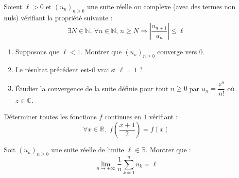 \documentclass[a4paper,twoside,french,11pt]{VcCours}
\begin{document}
\begin{Exercice} Soient $\ell>0$ et $(u_n)_{n \geq 0}$ une suite réelle ou complexe (avec des termes non nuls) vérifiant la propriété suivante :
$$\exists N \in \mathbb{N}, \, \forall n \in \mathbb{N}, \, n \geq N \Longrightarrow \left\vert \frac{u_{n+1}}{u_n} \right\vert   \leq \ell$$

\begin{enumerate}
\item Supposons que $\ell<1$. Montrer que $(u_n)_{n \geq 0}$ converge vers $0$.
\item Le résultat précédent est-il vrai si $\ell = 1$ ?
\item Étudier la convergence de la suite définie pour tout $n \geq 0$ par $u_n = \dfrac{z^n}{n!}$ où $z \in \mathbb{C}$.
\end{enumerate}
\end{Exercice}

\begin{Exercice}[$\bigstar$] Déterminer toutes les fonctions $f$ continues en $1$ vérifiant :
$$ \forall x \in \mathbb{R}, \, \, f \left( \frac{x+1}{2} \right) =f(x)$$
\end{Exercice}


\begin{Exercice}
Soit $(u_n)_{n \geq 0}$ une suite réelle de limite $\ell \in \mathbb{R}$. Montrer que :
$$ \lim_{n \rightarrow + \infty} \frac{1}{n} \sum_{k=1}^n u_k = \ell$$
\end{Exercice}
\end{document}
